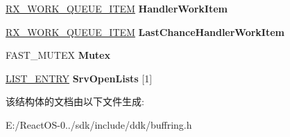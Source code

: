 \begin{DoxyCompactItemize}
\hyperlink{struct___r_x___w_o_r_k___q_u_e_u_e___i_t_e_m__}{R\+X\+\_\+\+W\+O\+R\+K\+\_\+\+Q\+U\+E\+U\+E\+\_\+\+I\+T\+EM} {\bfseries Handler\+Work\+Item}
\item 
\mbox{\label{struct___r_x___b_u_f_f_e_r_i_n_g___m_a_n_a_g_e_r___a6dcdfad192b7ae81b017436ba40d207a}} 
\hyperlink{struct___r_x___w_o_r_k___q_u_e_u_e___i_t_e_m__}{R\+X\+\_\+\+W\+O\+R\+K\+\_\+\+Q\+U\+E\+U\+E\+\_\+\+I\+T\+EM} {\bfseries Last\+Chance\+Handler\+Work\+Item}
\item 
\mbox{\label{struct___r_x___b_u_f_f_e_r_i_n_g___m_a_n_a_g_e_r___a0a6e420a2e35b74ae2e8f275cb833a73}} 
F\+A\+S\+T\+\_\+\+M\+U\+T\+EX {\bfseries Mutex}
\item 
\mbox{\label{struct___r_x___b_u_f_f_e_r_i_n_g___m_a_n_a_g_e_r___ad5f03086db80cee4c3c31bb23483de40}} 
\hyperlink{struct___l_i_s_t___e_n_t_r_y}{L\+I\+S\+T\+\_\+\+E\+N\+T\+RY} {\bfseries Srv\+Open\+Lists} \mbox{[}1\mbox{]}
\end{DoxyCompactItemize}


该结构体的文档由以下文件生成\+:\begin{DoxyCompactItemize}
\item 
E\+:/\+React\+O\+S-\/0../sdk/include/ddk/buffring.\+h\end{DoxyCompactItemize}
